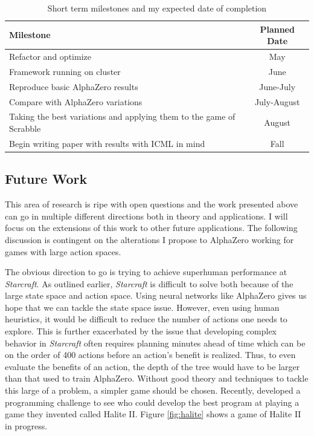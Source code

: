 \documentclass{article}
\begin{document}
  \begin{table}[H]
    \caption{Short term milestones and my expected date of completion}
    \label{table:milestones}
    \begin{center}
      \begin{tabular}{| p{} | c |}
        \hline
        Milestone & Planned Date \\
        \hline
        Refactor and optimize & May \\
        \hline
        Framework running on cluster & June \\
        \hline
        Reproduce basic AlphaZero results & June-July \\
        \hline
        Compare with AlphaZero variations & July-August \\
        \hline
        Taking the best variations and applying them to the game of Scrabble & August \\
        \hline
        Begin writing paper with results with ICML in mind & Fall \\
        \hline
      \end{tabular}
    \end{center}
  \end{table}

  \subsection{Future Work}

  This area of research is ripe with open questions and the work presented above can go in multiple different directions both in theory and applications. I will focus on the extensions of this work to other future applications. The following discussion is contingent on the alterations I propose to AlphaZero working for games with large action spaces.

  The obvious direction to go is trying to achieve superhuman performance at \textit{Starcraft}. As outlined earlier, \textit{Starcraft} is difficult to solve both because of the large state space and action space. Using neural networks like AlphaZero gives us hope that we can tackle the state space issue. However, even using human heuristics, it would be difficult to reduce the number of actions one needs to explore. This is further exacerbated by the issue that developing complex behavior in \textit{Starcraft} often requires planning minutes ahead of time which can be on the order of 400 actions before an action's benefit is realized. Thus, to even evaluate the benefits of an action, the depth of the tree would have to be larger than that used to train AlphaZero. Without good theory and techniques to tackle this large of a problem, a simpler game should be chosen. Recently,  developed a programming challenge to see who could develop the best program at playing a game they invented called Halite II. Figure \ref{fig:halite} shows a game of Halite II in progress.
\end{document}
